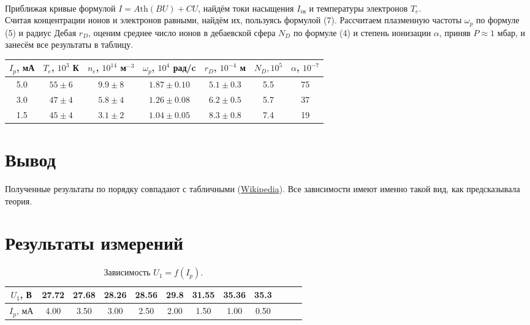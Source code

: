 \documentclass[a4paper,12pt]{article}
\begin{document}
$ $\\

Приближая кривые формулой $I = A \text{th}(BU) + CU$, найдём токи насыщения $I_{i\text{н}}$ и температуры электронов $T_e$.\\
Считая концентрации ионов и электронов равными, найдём их, пользуясь формулой (7). Рассчитаем плазменную частоты $\omega_p$ по формуле (5) и радиус Дебая $r_D$, оценим среднее число ионов в дебаевской сфера $N_D$ по формуле (4) и  степень ионизации $\alpha$, приняв $P\approx 1$ мбар, и занесём все результаты в таблицу.
\begin{table}[h!]
\centering
\begin{tabular}{|c|c|c|c|c|c|c|}
\hline
$I_p$, мА  & $T_e$, $10^3$ К   & $n_e$, $10^{14}$ м$^{-3}$ & $\omega_p$, $10^4$ рад/c & $r_D$, $10^{-4}$ м & $N_D, 10^5$ & $\alpha$, $10^{-7}$ \\ \hline
5.0   & $55\pm 6$ & $9.9\pm 8$                     & $1.87\pm 0.10$                   & $5.1\pm 0.3$                      & 5.5 & 75\\ \hline
3.0   & $47\pm 4$ & $5.8\pm 4$                     & $1.26\pm 0.08$                    & $6.2\pm 0.5$                      & 5.7 & 37\\ \hline
1.5   & $45\pm 4$ & $3.1\pm 2$                    & $1.04\pm 0.05$                     & $8.3 \pm 0.8$                     & 7.4 & 19\\ \hline
\end{tabular}
\end{table}

\section*{Вывод}

Полученные результаты по порядку совпадают с табличными (\href{https://en.wikipedia.org/wiki/Debye_length}{Wikipedia}). Все зависимости имеют именно такой вид, как предсказывала теория.
\newpage
\section*{Результаты измерений}
\begin{table}[h]
\centering
\begin{tabular}{|c|c|c|c|c|c|c|c|c|c|c|c|}
\hline
$U_1$, В & 27.72 & 27.68 & 28.26 & 28.56 & 29.8 & 31.55 & 35.36 & 35.3 \\ \hline
$I_p$, мА & 4.00 & 3.50  & 3.00  & 2.50 & 2.00  & 1.50  & 1.00  & 0.50 \\ \hline
\end{tabular}
\caption{Зависимость $U_1 = f(I_p)$.}
\end{table}
\end{document}
